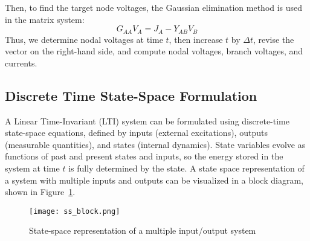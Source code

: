 Then, to find the target node voltages, the Gaussian elimination method is used in the matrix system:
\begin{equation}
    G_{AA} V_{A}=J_{A}-Y_{AB} V_{B}
\end{equation}
Thus, we determine nodal voltages at time $t$, then increase $t$ by $\Delta t$, revise the vector on the right-hand side, and compute nodal voltages, branch voltages, and currents.

\subsection{Discrete Time State-Space Formulation}\label{subsec:ch3/sec5/sub2}
A Linear Time-Invariant (LTI) system can be formulated using discrete-time state-space equations, defined by inputs (external excitations), outputs (measurable quantities), and states (internal dynamics). State variables evolve as functions of past and present states and inputs, so the energy stored in the system at time $t$ is fully determined by the state. A state space representation of a system with multiple inputs and outputs can be visualized in a block diagram, shown in Figure~\cref{fig:ss_block}. 
\begin{figure}[htbp]
    \centering
    \texttt{[image: ss\_block.png]}
    \caption{State-space representation of a multiple input/output system}
    \label{fig:ss_block}
\end{figure}

